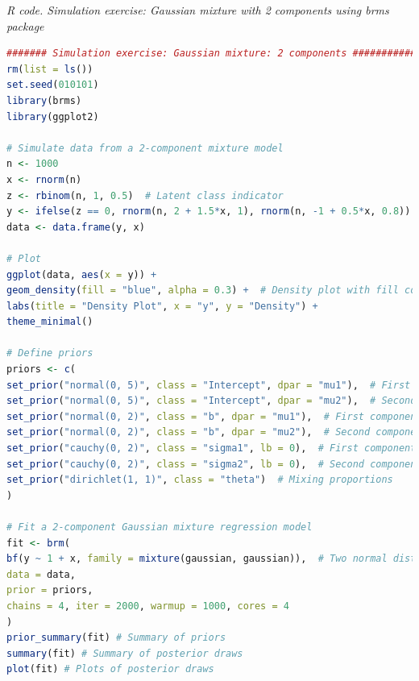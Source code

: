 \begin{tcolorbox}[enhanced,width=4.67in,center upper,
	fontupper=\large\bfseries,drop shadow southwest,sharp corners]
	\textit{R code. Simulation exercise: Gaussian mixture with 2 components using brms package}
	\begin{VF}
		\begin{lstlisting}[language=R]
####### Simulation exercise: Gaussian mixture: 2 components #############
rm(list = ls())
set.seed(010101)
library(brms)
library(ggplot2)

# Simulate data from a 2-component mixture model
n <- 1000
x <- rnorm(n)
z <- rbinom(n, 1, 0.5)  # Latent class indicator
y <- ifelse(z == 0, rnorm(n, 2 + 1.5*x, 1), rnorm(n, -1 + 0.5*x, 0.8))
data <- data.frame(y, x)

# Plot
ggplot(data, aes(x = y)) +
geom_density(fill = "blue", alpha = 0.3) +  # Density plot with fill color
labs(title = "Density Plot", x = "y", y = "Density") +
theme_minimal()

# Define priors
priors <- c(
set_prior("normal(0, 5)", class = "Intercept", dpar = "mu1"),  # First component intercept
set_prior("normal(0, 5)", class = "Intercept", dpar = "mu2"),  # Second component intercept
set_prior("normal(0, 2)", class = "b", dpar = "mu1"),  # First component slope
set_prior("normal(0, 2)", class = "b", dpar = "mu2"),  # Second component slope
set_prior("cauchy(0, 2)", class = "sigma1", lb = 0),  # First component sigma
set_prior("cauchy(0, 2)", class = "sigma2", lb = 0),  # Second component sigma
set_prior("dirichlet(1, 1)", class = "theta")  # Mixing proportions
)

# Fit a 2-component Gaussian mixture regression model
fit <- brm(
bf(y ~ 1 + x, family = mixture(gaussian, gaussian)),  # Two normal distributions
data = data,
prior = priors,
chains = 4, iter = 2000, warmup = 1000, cores = 4
)
prior_summary(fit) # Summary of priors
summary(fit) # Summary of posterior draws
plot(fit) # Plots of posterior draws
		\end{lstlisting}
	\end{VF}
\end{tcolorbox}

